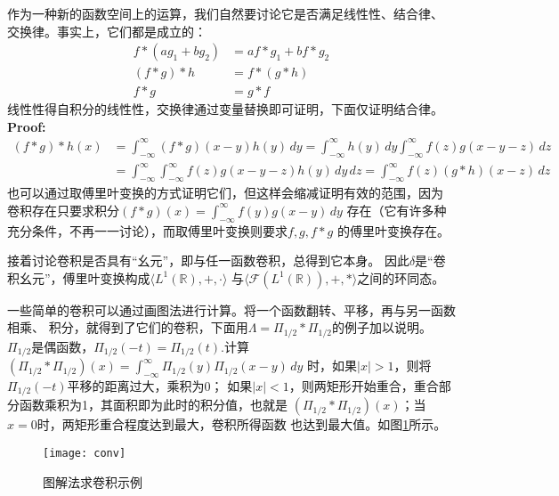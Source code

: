 \documentclass{ctexbook}
\begin{document}
作为一种新的函数空间上的运算，我们自然要讨论它是否满足线性性、结合律、
交换律。事实上，它们都是成立的：
\begin{align}
    f*(ag_1+bg_2) & =af*g_1+bf*g_2 \\
    (f*g)*h       & =f*(g*h)       \\
    f*g           & =g*f
\end{align}
线性性得自积分的线性性，交换律通过变量替换即可证明，下面仅证明结合律。\\
\textbf{Proof:}
\begin{align*}
    (f*g)*h(x) & =\int_{-\infty}^{\infty}(f*g)(x-y)h(y)\,dy=\int_{-\infty}^{\infty}h(y)\,dy\int_{-\infty}^{\infty}f(z)g(x-y-z)\,dz \\
               & =\int_{-\infty}^{\infty}\int_{-\infty}^{\infty}f(z)g(x-y-z)h(y)\,dy\,dz=\int_{-\infty}^{\infty}f(z)(g*h)(x-z)\,dz
\end{align*}
也可以通过取傅里叶变换的方式证明它们，但这样会缩减证明有效的范围，因为
卷积存在只要求积分$(f*g)(x)=\int_{-\infty}^{\infty}f(y)g(x-y)\,dy$
存在（它有许多种充分条件，不再一一讨论），而取傅里叶变换则要求$f,g,f*g$
的傅里叶变换存在。

接着讨论卷积是否具有“幺元”，即与任一函数卷积，总得到它本身。
因此$\delta$是“卷积幺元”，傅里叶变换构成$\langle L^1(\mathbb{R}),+,\cdot\rangle$
与$\langle \mathcal{F} (L^1(\mathbb{R})),+,*\rangle$之间的环同态。

一些简单的卷积可以通过画图法进行计算。将一个函数翻转、平移，再与另一函数相乘、
积分，就得到了它们的卷积，下面用$\Lambda=\Pi_{1/2}*\Pi_{1/2}$的例子加以说明。
$\Pi_{1/2}$是偶函数，$\Pi_{1/2}(-t)=\Pi_{1/2}(t)$.计算
$(\Pi_{1/2}*\Pi_{1/2})(x)=\int_{-\infty}^{\infty}\Pi_{1/2}(y)\Pi_{1/2}(x-y)\,dy$
时，如果$|x|>1$，则将$\Pi_{1/2}(-t)$平移的距离过大，乘积为0；
如果$|x|<1$，则两矩形开始重合，重合部分函数乘积为1，其面积即为此时的积分值，也就是
$(\Pi_{1/2}*\Pi_{1/2})(x)$；当$x=0$时，两矩形重合程度达到最大，卷积所得函数
也达到最大值。如图\ref{fig:conv}所示。
\begin{figure}[H]
    \centering
    \texttt{[image: conv]}
    \caption{图解法求卷积示例}\label{fig:conv}
\end{figure}
\end{document}
